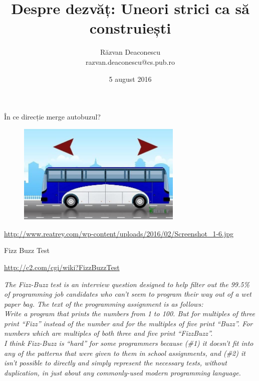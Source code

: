 \documentclass{simple}
\title[Despre dezvăț]{Despre dezvăț: Uneori strici ca să construiești}
\institute{InfoEducație 2016 (Gălăciuc, Vrancea)}
\author[Răzvan Deaconescu]{Răzvan Deaconescu \\
razvan.deaconescu@cs.pub.ro}
\date{5 august 2016}
\begin{document}
\frame{\titlepage}

\begin{frame}{În ce direcție merge autobuzul?}
  \begin{figure}
    \centering
    \includegraphics[width=0.7\textwidth]{img/bus-direction}
  \end{figure}
  \begin{center}
    \scriptsize
    \url{http://www.reatrey.com/wp-content/uploads/2016/02/Screenshot_1-6.jpg}
  \end{center}
\end{frame}

\begin{frame}{Fizz Buzz Test}
  \begin{center}
    \small
    \url{http://c2.com/cgi/wiki?FizzBuzzTest}
  \end{center}
  \scriptsize
  \pause \textit{The Fizz-Buzz test is an interview question designed to help filter out the 99.5\% of programming job candidates who can't seem to program their way out of a wet paper bag. The text of the programming assignment is as follows:} \\
  \vspace{3mm}
  \pause \textit{Write a program that prints the numbers from 1 to 100. But for multiples of three print ``Fizz'' instead of the number and for the multiples of five print ``Buzz''. For numbers which are multiples of both three and five print ``FizzBuzz''.} \\
  \vspace{3mm}
  \pause \textit{I think Fizz-Buzz is ``hard'' for some programmers because (\#1) it doesn't fit into any of the patterns that were given to them in school assignments, and (\#2) it isn't possible to directly and simply represent the necessary tests, without duplication, in just about any commonly-used modern programming language.} \\
\end{frame}
\end{document}
